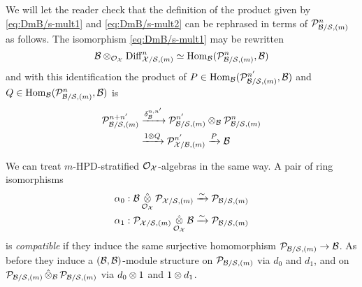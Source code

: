 \documentclass{article}
\theoremstyle{change}
\numberwithin{equation}{subsubsection}
\begin{document}
We will let the reader check that the definition of the product given
by \ref{eq:DmB/s-mult1} and \ref{eq:DmB/s-mult2} can be rephrased in
terms of ${\cal P}^n_{{\cal B}/{\cal S},(m)}$ as follows. The isomorphism
\ref{eq:DmB/s-mult1} may be rewritten
\begin{equation}
  \label{eq:DmB/s-mult3}
  {\cal B}\otimes_{{\cal O}_{\cal X}}{\operatorname{Diff}}^n_{{\cal X}/{\cal S},(m)}\simeq{\operatorname{Hom}}_{\cal B}({\cal P}^n_{{\cal B}/{\cal S},(m)},{\cal B})
\end{equation}
and with this identification the product of
$P\in{\operatorname{Hom}}_{\cal B}({\cal P}^{n'}_{{\cal B}/{\cal S},(m)},{\cal B})$ and
$Q\in{\operatorname{Hom}}_{\cal B}({\cal P}^n_{{\cal B}/{\cal S},(m)},{\cal B})$ is
\begin{equation}
  \label{eq:DmB/s-mult4}
  \begin{split}
    {\cal P}^{n+n'}_{{\cal B}/{\cal S},(m)}
    &\xrightarrow{\delta^{n,n'}_{\cal B}}{\cal P}^{n'}_{{\cal B}/{\cal S},(m)}\otimes_{\cal B}{\cal P}^n_{{\cal B}/{\cal S},(m)}\\
    &\xrightarrow{1\otimes Q}{\cal P}^{n'}_{{\cal X}/{\cal B},(m)}\xrightarrow{P}{\cal B}
  \end{split}
\end{equation}

We can treat $m$-HPD-stratified ${\cal O}_{\cal X}$-algebras in the same way. A
pair of ring isomorphisms
\begin{equation}
  \label{eq:cP_B}
  \begin{split}
    \alpha_0:{\cal B}\mathop{\hat\otimes}_{{\cal O}_{\cal X}}{\cal P}_{{\cal X}/{\cal S},(m)}&\xrightarrow{\sim}{\cal P}_{{\cal B}/{\cal S},(m)}\\
    \alpha_1:{\cal P}_{{\cal X}/{\cal S},(m)}\mathop{\hat\otimes}_{{\cal O}_{\cal X}}{\cal B}&\xrightarrow{\sim}{\cal P}_{{\cal B}/{\cal S},(m)}
  \end{split}
\end{equation}
is \textit{compatible} if they induce the same surjective homomorphism
${\cal P}_{{\cal B}/{\cal S},(m)}\to{\cal B}$. As before they induce a
$({\cal B},{\cal B})$-module structure on ${\cal P}_{{\cal B}/{\cal S},(m)}$ via $d_0$ and
$d_1$,  and on
${\cal P}_{{\cal B}/{\cal S},(m)}\mathop{\hat\otimes}_{\cal B}{\cal P}_{{\cal B}/{\cal S},(m)}$ via $d_0\otimes1$ and
$1\otimes d_1$.
\end{document}
